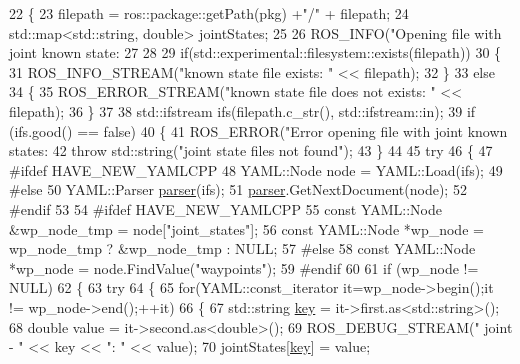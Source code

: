 \begin{DoxyCode}
22 \{
23   filepath = ros::package::getPath(pkg) +\textcolor{stringliteral}{"/"} + filepath;
24   std::map<std::string, double> jointStates;
25 
26   ROS\_INFO(\textcolor{stringliteral}{"Opening file with joint known state: %
27 
28 
29   \textcolor{keywordflow}{if}(std::experimental::filesystem::exists(filepath))
30   \{
31     ROS\_INFO\_STREAM(\textcolor{stringliteral}{"known state file exists: "} << filepath);
32   \}
33   \textcolor{keywordflow}{else}
34   \{
35     ROS\_ERROR\_STREAM(\textcolor{stringliteral}{"known state file does not exists: "} << filepath);
36   \}
37 
38   std::ifstream ifs(filepath.c\_str(), std::ifstream::in);
39   \textcolor{keywordflow}{if} (ifs.good() == \textcolor{keyword}{false})
40   \{
41     ROS\_ERROR(\textcolor{stringliteral}{"Error opening file with joint known states: %
42     \textcolor{keywordflow}{throw} std::string(\textcolor{stringliteral}{"joint state files not found"});
43   \}
44 
45   \textcolor{keywordflow}{try}
46   \{
47 \textcolor{preprocessor}{#ifdef HAVE\_NEW\_YAMLCPP}
48     YAML::Node node = YAML::Load(ifs);
49 \textcolor{preprocessor}{#else}
50     YAML::Parser \hyperlink{namespacegenerate__debs_a4a9ae4bb85fc62d7973ea3d09ced6c26}{parser}(ifs);
51     \hyperlink{namespacegenerate__debs_a4a9ae4bb85fc62d7973ea3d09ced6c26}{parser}.GetNextDocument(node);
52 \textcolor{preprocessor}{#endif}
53 
54 \textcolor{preprocessor}{#ifdef HAVE\_NEW\_YAMLCPP}
55     \textcolor{keyword}{const} YAML::Node &wp\_node\_tmp = node[\textcolor{stringliteral}{"joint\_states"}];
56     \textcolor{keyword}{const} YAML::Node *wp\_node = wp\_node\_tmp ? &wp\_node\_tmp : NULL;
57 \textcolor{preprocessor}{#else}
58     \textcolor{keyword}{const} YAML::Node *wp\_node = node.FindValue(\textcolor{stringliteral}{"waypoints"});
59 \textcolor{preprocessor}{#endif}
60 
61     \textcolor{keywordflow}{if} (wp\_node != NULL)
62     \{
63       \textcolor{keywordflow}{try}
64       \{
65         \textcolor{keywordflow}{for}(YAML::const\_iterator it=wp\_node->begin();it != wp\_node->end();++it) 
66         \{
67           std::string \hyperlink{namespacekeyboard__server__node_af0ebd8a9e1564ddc13a227c727602466}{key} = it->first.as<std::string>(); 
68           \textcolor{keywordtype}{double} value = it->second.as<\textcolor{keywordtype}{double}>(); 
69           ROS\_DEBUG\_STREAM(\textcolor{stringliteral}{" joint - "} << key << \textcolor{stringliteral}{": "} << value);
70           jointStates[\hyperlink{namespacekeyboard__server__node_af0ebd8a9e1564ddc13a227c727602466}{key}] = value;
}}
\end{DoxyCode}
